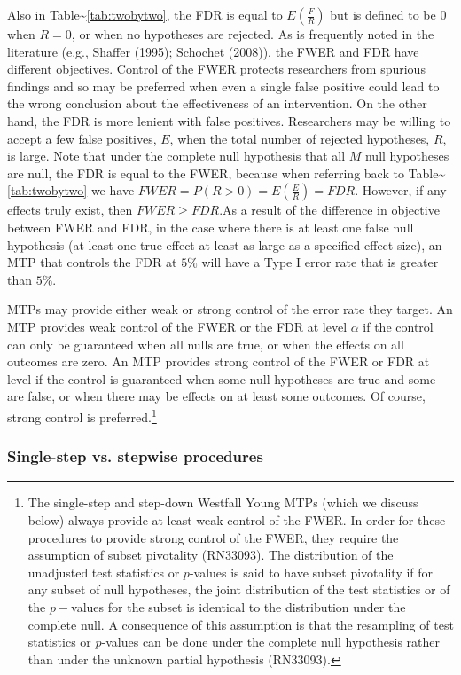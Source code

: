 \documentclass[
]{article}
\begin{document}
Also in Table\textasciitilde{}\ref{tab:twobytwo}, the FDR is equal to
\(E(\frac{F}{R})\) but is defined to be \(0\) when \(R=0\), or when no
hypotheses are rejected. As is frequently noted in the literature (e.g.,
Shaffer (1995); Schochet (2008)), the FWER and FDR have different
objectives. Control of the FWER protects researchers from spurious
findings and so may be preferred when even a single false positive could
lead to the wrong conclusion about the effectiveness of an intervention.
On the other hand, the FDR is more lenient with false positives.
Researchers may be willing to accept a few false positives, \(E\), when
the total number of rejected hypotheses, \(R\), is large. Note that
under the complete null hypothesis that all \(M\) null hypotheses are
null, the FDR is equal to the FWER, because when referring back to
Table\textasciitilde{}\ref{tab:twobytwo} we have
\(FWER=P(R>0)=E(\frac{E}{R})=FDR\). However, if any effects truly exist,
then \(FWER \geq FDR\).As a result of the difference in objective
between FWER and FDR, in the case where there is at least one false null
hypothesis (at least one true effect at least as large as a specified
effect size), an MTP that controls the FDR at \(5\%\) will have a Type I
error rate that is greater than \(5\%\).

MTPs may provide either weak or strong control of the error rate they
target. An MTP provides weak control of the FWER or the FDR at level
\(\alpha\) if the control can only be guaranteed when all nulls are
true, or when the effects on all outcomes are zero. An MTP provides
strong control of the FWER or FDR at level if the control is guaranteed
when some null hypotheses are true and some are false, or when there may
be effects on at least some outcomes. Of course, strong control is
preferred.\footnote{The single-step and step-down Westfall Young MTPs (which we discuss below) always provide at least weak control of the FWER.
In order for these procedures to provide strong control of the FWER, they require the assumption of subset pivotality (RN33093).
The distribution of the unadjusted test statistics or $p$-values is said to have subset pivotality if for any subset of null hypotheses, the joint distribution of the test statistics or of the $p-$values for the subset is identical to the distribution under the complete null.
A consequence of this assumption is that the resampling of test statistics or $p$-values can be done under the complete null hypothesis rather than under the unknown partial hypothesis (RN33093).}

\subsubsection{Single-step vs. stepwise procedures}
\label{sec:stepwise}
\end{document}
